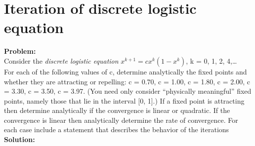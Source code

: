 \newpage

\section{Iteration of discrete logistic equation}%

\textbf{Problem:}
\\
Consider the \textit{discrete logistic equation}
$x^{k+1} = cx^{k} (1-x^{k})$, k = 0, 1, 2, 4,\ldots
\\
For each of the following values of c, determine analytically the fixed points and whether they are attracting or repelling: c = 0.70, c = 1.00, c = 1.80, c = 2.00, c = 3.30, c = 3.50, c = 3.97. (You need only consider “physically meaningful” fixed points, namely those that lie in the interval [0, 1].)
If a fixed point is attracting then determine analytically if the convergence is linear or quadratic.
If the convergence is linear then analytically determine the rate of convergence.
For each case include a statement that describes the behavior of the iterations
\\
\textbf{Solution:}

\newpage

